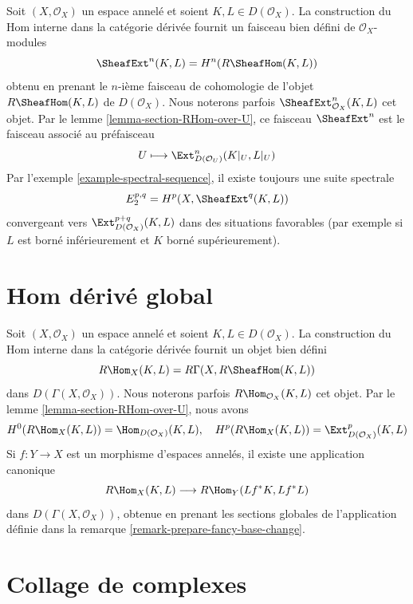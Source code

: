 {\noindent

Soit $(X, \mathcal{O}_X)$ un espace annelé et soient $K, L \in D(\mathcal{O}_X)$. La construction du Hom interne dans la catégorie dérivée fournit un faisceau bien défini de $\mathcal{O}_X$-modules
$$
\SheafExt^n(K, L) = H^n(R\SheafHom(K, L))
$$
obtenu en prenant le $n$-ième faisceau de cohomologie de l'objet $R\SheafHom(K, L)$
de $D(\mathcal{O}_X)$. Nous noterons parfois
$\SheafExt^n_{\mathcal{O}_X}(K, L)$ cet objet. Par le lemme \ref{lemma-section-RHom-over-U},
ce faisceau $\SheafExt^n$ est le faisceau associé au préfaisceau
$$
U \longmapsto \Ext^n_{D(\mathcal{O}_U)}(K|_U, L|_U)
$$
Par l'exemple \ref{example-spectral-sequence}, il existe toujours une suite spectrale
$$
E_2^{p, q} = H^p(X, \SheafExt^q(K, L))
$$
convergeant vers $\Ext^{p + q}_{D(\mathcal{O}_X)}(K, L)$
dans des situations favorables (par exemple si $L$ est borné inférieurement et
$K$ borné supérieurement).





\section{Hom dérivé global}

\label{section-global-RHom}

\noindent

Soit $(X, \mathcal{O}_X)$ un espace annelé et soient $K, L \in D(\mathcal{O}_X)$. La construction du Hom interne dans la catégorie dérivée fournit un objet bien défini
$$
R\Hom_X(K, L) = R\Gamma(X, R\SheafHom(K, L))
$$
dans $D(\Gamma(X, \mathcal{O}_X))$. Nous noterons parfois
$R\Hom_{\mathcal{O}_X}(K, L)$ cet objet. Par le lemme \ref{lemma-section-RHom-over-U},
nous avons
$$
H^0(R\Hom_X(K, L)) = \Hom_{D(\mathcal{O}_X)}(K, L),
\quad
H^p(R\Hom_X(K, L)) = \Ext_{D(\mathcal{O}_X)}^p(K, L)
$$
Si $f : Y \to X$ est un morphisme d'espaces annelés, il existe une application canonique
$$
R\Hom_X(K, L) \longrightarrow R\Hom_Y(Lf^*K, Lf^*L)
$$
dans $D(\Gamma(X, \mathcal{O}_X))$, obtenue en prenant les sections globales de l'application définie dans la remarque \ref{remark-prepare-fancy-base-change}.







\section{Collage de complexes}

}

